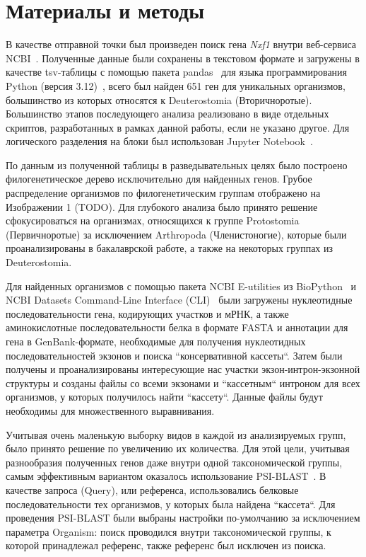 \newpage
\section{Материалы и методы}

В качестве отправной точки был произведен поиск гена \textit{Nxf1} внутри веб-сервиса NCBI~\cite{ncbi_general}.
Полученные данные были сохранены в текстовом формате и загружены в качестве tsv-таблицы с помощью пакета pandas~\cite{pandas} для языка программирования Python (версия 3.12)~\cite{python_3_12}, всего был найден 651 ген для уникальных организмов, большинство из которых относятся к Deuterostomia (Вторичноротые).
Большинство этапов последующего анализа реализовано в виде отдельных скриптов, разработанных в рамках данной работы, если не указано другое.
Для логического разделения на блоки был использован Jupyter Notebook~\cite{jupyter_notebook}.

По данным из полученной таблицы в разведывательных целях было построено филогенетическое дерево исключительно для найденных генов.
Грубое распределение организмов по филогенетическим группам отображено на Изображении 1 (TODO).
Для глубокого анализа было принято решение сфокусироваться на организмах, относящихся к группе Protostomia (Первичноротые) за исключением Arthropoda (Членистоногие), которые были проанализированы в бакалаврской работе, а также на некоторых группах из Deuterostomia.

Для найденных организмов с помощью пакета NCBI E-utilities из BioPython~\cite{biopython} и NCBI Datasets Command-Line Interface (CLI)~\cite{datasets} были загружены нуклеотидные последовательности гена, кодирующих участков и мРНК, а также аминокислотные последовательности белка в формате FASTA и аннотации для гена в GenBank-формате, необходимые для получения нуклеотидных последовательностей экзонов и поиска ``консервативной кассеты``.
Затем были получены и проанализированы интересующие нас участки экзон-интрон-экзонной структуры и созданы файлы со всеми экзонами и ``кассетным`` интроном для всех организмов, у которых получилось найти ``кассету``.
Данные файлы будут необходимы для множественного выравнивания.

Учитывая очень маленькую выборку видов в каждой из анализируемых групп, было принято решение по увеличению их количества.
Для этой цели, учитывая разнообразия полученных генов даже внутри одной таксономической группы, самым эффективным вариантом оказалось использование PSI-BLAST~\cite{psi_blast}.
В качестве запроса (Query), или референса, использовались белковые последовательности тех организмов, у которых была найдена ``кассета``.
Для проведения PSI-BLAST были выбраны настройки по-умолчанию за исключением параметра Organism: поиск проводился внутри таксономической группы, к которой принадлежал референс, также референс был исключен из поиска.

